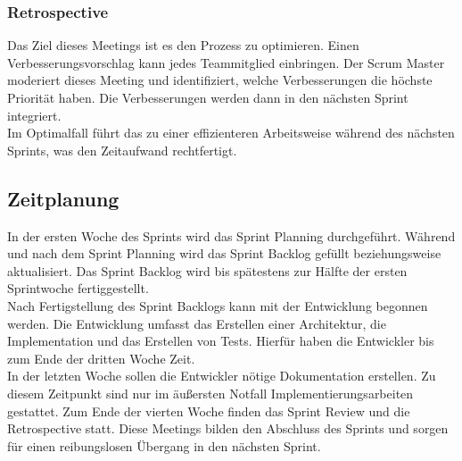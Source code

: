 \documentclass{article}
\begin{document}
\subsubsection{Retrospective}
Das Ziel dieses Meetings ist es den Prozess zu optimieren.
Einen Verbesserungsvorschlag kann jedes Teammitglied einbringen.
Der Scrum Master moderiert dieses Meeting und identifiziert, welche Verbesserungen die höchste Priorität haben.
Die Verbesserungen werden dann in den nächsten Sprint integriert.\\
Im Optimalfall führt das zu einer effizienteren Arbeitsweise während des nächsten Sprints, was den Zeitaufwand rechtfertigt.\\

\subsection{Zeitplanung}
In der ersten Woche des Sprints wird das Sprint Planning durchgeführt.
Während und nach dem Sprint Planning wird das Sprint Backlog gefüllt beziehungsweise aktualisiert.
Das Sprint Backlog wird bis spätestens zur Hälfte der ersten Sprintwoche fertiggestellt.\\
Nach Fertigstellung des Sprint Backlogs kann mit der Entwicklung begonnen werden.
Die Entwicklung umfasst das Erstellen einer Architektur, die Implementation und das Erstellen von Tests.
Hierfür haben die Entwickler bis zum Ende der dritten Woche Zeit.\\
In der letzten Woche sollen die Entwickler nötige Dokumentation erstellen.
Zu diesem Zeitpunkt sind nur im äußersten Notfall Implementierungsarbeiten gestattet.
Zum Ende der vierten Woche finden das Sprint Review und die Retrospective statt.
Diese Meetings bilden den Abschluss des Sprints und sorgen für einen reibungslosen Übergang in den nächsten Sprint.
\end{document}
